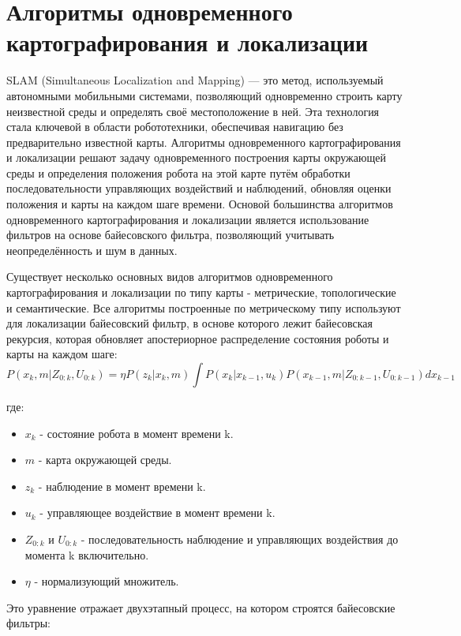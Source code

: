 \documentclass[a4paper, 14pt]{extreport}
\begin{document}
\section{Алгоритмы одновременного картографирования и локализации}
\par SLAM (Simultaneous Localization and Mapping)\cite{slamMain}\cite{slamArt0} — это метод, используемый автономными мобильными системами\cite{amrBook},
позволяющий одновременно
строить карту неизвестной среды и определять своё местоположение в ней. Эта технология стала ключевой в области робототехники, обеспечивая
навигацию без предварительно известной карты. Алгоритмы одновременного картографирования и локализации решают задачу одновременного 
построения карты окружающей среды и определения положения робота на этой карте путём обработки последовательности управляющих воздействий
и наблюдений, обновляя оценки положения и карты на каждом шаге времени. Основой большинства алгоритмов одновременного картографирования 
и локализации является использование фильтров на основе байесовского фильтра\cite{bayesBook}\cite{bayesArt}, позволяющий учитывать неопределённость и шум в данных.
\par Существует несколько основных видов алгоритмов одновременного картографирования и локализации по типу карты\cite{slamArt1} - метрические, 
топологические и семантические. Все алгоритмы построенные по метрическому типу используют для локализации байесовский фильтр,
в основе которого лежит байесовская рекурсия, которая обновляет апостериорное распределение состояния роботы и карты на каждом шаге:
\[
   P(x_k,m|Z_{0:k},U_{0:k}) = \eta P(z_k|x_k,m) \int P(x_k|x_{k-1},u_k) P(x_{k-1},m|Z_{0:k-1}, U_{0:k-1}) dx_{k-1}
\]
\par\noindent где:
\begin{itemize}
        \item \(x_k\) - состояние робота в момент времени k.
        \item \(m\) - карта окружающей среды.
        \item \(z_k\) - наблюдение в момент времени k.
        \item \(u_k\) - управляющее воздействие в момент времени k.
        \item \(Z_{0:k}\) и \(U_{0:k}\) - последовательность наблюдение и управляющих воздействия до момента k включительно.
        \item \(\eta\) - нормализующий множитель.
\end{itemize}
\par Это уравнение отражает двухэтапный процесс, на котором строятся байесовские фильтры:
\end{document}
